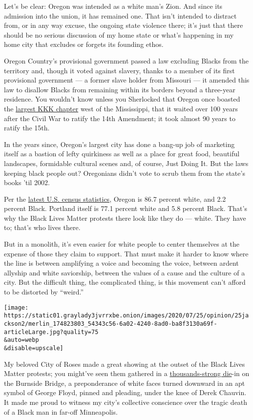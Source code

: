 Let's be clear: Oregon was intended as a white man's Zion. And since its
admission into the union, it has remained one. That isn't intended to
distract from, or in any way excuse, the ongoing state violence there;
it's just that there should be no serious discussion of my home state or
what's happening in my home city that excludes or forgets its founding
ethos.

Oregon Country's provisional government passed a law excluding Blacks
from the territory and, though it voted against slavery, thanks to a
member of its first provisional government --- a former slave holder
from Missouri --- it amended this law to disallow Blacks from remaining
within its borders beyond a three-year residence. You wouldn't know
unless you Sherlocked that Oregon once boasted the
\href{https://www.wweek.com/arts/2017/08/17/oregon-was-once-ku-ku-for-the-klan/}{largest
KKK chapter} west of the Mississippi, that it waited over 100 years
after the Civil War to ratify the 14th Amendment; it took almost 90
years to ratify the 15th.

In the years since, Oregon's largest city has done a bang-up job of
marketing itself as a bastion of lefty quirkiness as well as a place for
great food, beautiful landscapes, formidable cultural scenes and, of
course, Just Doing It. But the laws keeping black people out? Oregonians
didn't vote to scrub them from the state's books 'til 2002.

Per the
\href{https://www.census.gov/quickfacts/fact/table/portlandcityoregon,OR/PST045219}{latest
U.S. census statistics}, Oregon is 86.7 percent white, and 2.2 percent
Black. Portland itself is 77.1 percent white and 5.8 percent Black.
That's why the Black Lives Matter protests there look like they do ---
white. They have to; that's who lives there.

But in a monolith, it's even easier for white people to center
themselves at the expense of those they claim to support. That must make
it harder to know where the line is between amplifying a voice and
becoming the voice, between ardent allyship and white saviorship,
between the values of a cause and the culture of a city. But the
difficult thing, the complicated thing, is this movement can't afford to
be distorted by ``weird.''

\texttt{[image: https://static01.graylady3jvrrxbe.onion/images/2020/07/25/opinion/25jackson2/merlin\_174823803\_54343c56-6a02-4240-8ad0-ba8f3130a69f-articleLarge.jpg?quality=75\\\&auto=webp\\\&disable=upscale]}

My beloved City of Roses made a great showing at the outset of the Black
Lives Matter protests; you might've seen them gathered in a
\href{https://www.oregonlive.com/news/2020/06/the-world-needs-to-see-this-the-story-behind-the-iconic-photo-of-the-burnside-bridge-protest-in-portland.html}{thousands-strong
die}-in on the Burnside Bridge, a preponderance of white faces turned
downward in an apt symbol of George Floyd, pinned and pleading, under
the knee of Derek Chauvin. It made me proud to witness my city's
collective conscience over the tragic death of a Black man in far-off
Minneapolis.

